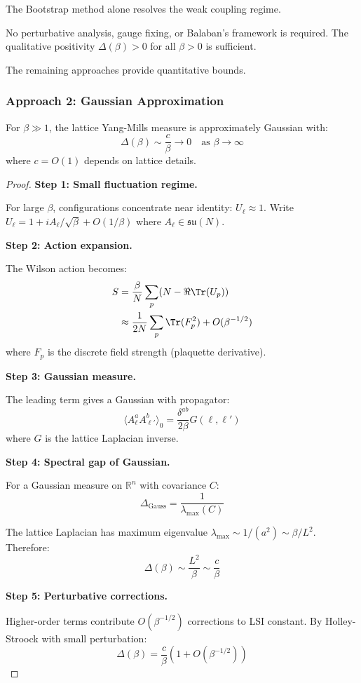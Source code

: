 \begin{remark}
\label{rmk:bootstrap-suffices}
The Bootstrap method alone resolves the weak coupling regime.

No perturbative analysis, gauge fixing, or Balaban's framework is required.
The qualitative positivity $\Delta(\beta) > 0$ for all $\beta > 0$ is sufficient.

The remaining approaches provide quantitative bounds.
\end{remark}

\subsubsection{Approach 2: Gaussian Approximation}

\begin{theorem}
\label{thm:weak-gaussian}
For $\beta \gg 1$, the lattice Yang-Mills measure is approximately Gaussian with:
\[
\Delta(\beta) \sim \frac{c}{\beta} \to 0 \quad \text{as } \beta \to \infty
\]
where $c = O(1)$ depends on lattice details.
\end{theorem}

\begin{proof}
\textbf{Step 1: Small fluctuation regime.}

For large $\beta$, configurations concentrate near identity: $U_\ell \approx 1$.
Write $U_\ell = 1 + iA_\ell/\sqrt{\beta} + O(1/\beta)$ where $A_\ell \in \mathfrak{su}(N)$.

\textbf{Step 2: Action expansion.}

The Wilson action becomes:
\begin{align*}
S &= \frac{\beta}{N} \sum_p (N - \Re\Tr(U_p)) \\
&\approx \frac{1}{2N} \sum_p \Tr(F_p^2) + O(\beta^{-1/2})
\end{align*}
where $F_p$ is the discrete field strength (plaquette derivative).

\textbf{Step 3: Gaussian measure.}

The leading term gives a Gaussian with propagator:
\[
\langle A_\ell^a A_{\ell'}^b \rangle_0 = \frac{\delta^{ab}}{2\beta} G(\ell, \ell')
\]
where $G$ is the lattice Laplacian inverse.

\textbf{Step 4: Spectral gap of Gaussian.}

For a Gaussian measure on $\mathbb{R}^n$ with covariance $C$:
\[
\Delta_{\text{Gauss}} = \frac{1}{\lambda_{\max}(C)}
\]

The lattice Laplacian has maximum eigenvalue $\lambda_{\max} \sim 1/(a^2) \sim \beta/L^2$.
Therefore:
\[
\Delta(\beta) \sim \frac{L^2}{\beta} \sim \frac{c}{\beta}
\]

\textbf{Step 5: Perturbative corrections.}

Higher-order terms contribute $O(\beta^{-1/2})$ corrections to LSI constant.
By Holley-Stroock with small perturbation:
\[
\Delta(\beta) = \frac{c}{\beta}(1 + O(\beta^{-1/2}))
\]
\end{proof}

